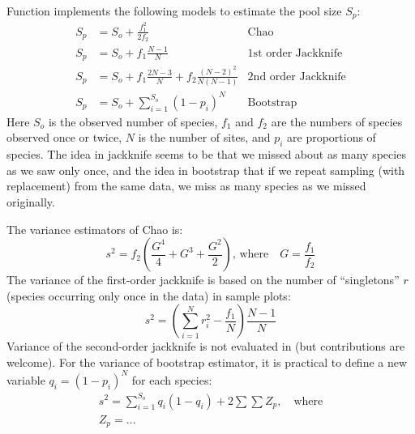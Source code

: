\documentclass[article,nojss]{jss}
\begin{document}
Function  implements the following models to estimate
the pool size $S_p$:
\begin{align}
S_p &= S_o + \frac{f_1^2}{2 f_2} & \text{Chao}\\
S_p &= S_o + f_1 \frac{N-1}{N} & \text{1st order Jackknife}\\
S_p & = S_o + f_1 \frac{2N-3}{N} + f_2 \frac{(N-2)^2}{N(N-1)} &
\text{2nd order Jackknife}\\
S_p &= S_o + \sum_{i=1}^{S_o} (1-p_i)^N & \text{Bootstrap}
\end{align}
Here $S_o$ is the observed number of species, $f_1$ and $f_2$ are the
numbers of species observed once or twice, $N$ is the number of sites,
and $p_i$ are proportions of species.  The idea in jackknife seems to
be that we missed about as many species as we saw only once, and the
idea in bootstrap that if we repeat sampling (with replacement) from
the same data, we miss as many species as we missed originally.

The variance estimators of Chao is:
\begin{equation}
s^2 = f_2 \left(\frac{G^4}{4} + G^3 + \frac{G^2}{2} \right), \,
\text{where}\quad G = \frac{f_1}{f_2}
\end{equation}
The variance of the first-order jackknife is based on the number of
``singletons'' $r$ (species occurring only once in the data) in sample
plots:
\begin{equation}
s^2 = \left(\sum_{i=1}^N r_i^2 - \frac{f_1}{N}\right) \frac{N-1}{N}
\end{equation}
Variance of the second-order jackknife is not evaluated in
 (but contributions are welcome).
For the variance of bootstrap estimator, it is practical to define a
new variable $q_i = (1-p_i)^N$ for each species:
\begin{equation}
\begin{split}
s^2 = \sum_{i=1}^{S_o} q_i (1-q_i) + 2 \sum \sum Z_p , \quad \text{where} \\
Z_p = \dots
\end{split}
\end{equation}
\end{document}
